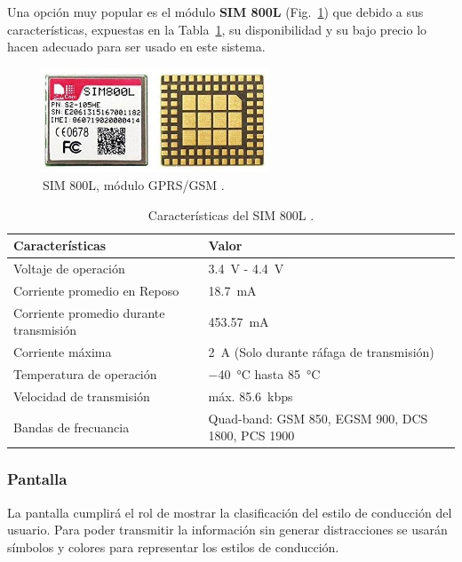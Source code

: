 Una opción muy popular es el módulo \textbf{SIM 800L} (Fig.~\ref{fig:SIM}) que debido a sus características, expuestas en la Tabla~\ref{diag:SIM}, su disponibilidad y su bajo precio lo hacen adecuado para ser usado en este sistema.

\begin{figure}[hbtp!]
\centering
\includegraphics[width=0.6\textwidth]{SIM800L.jpg}
\caption[SIM 800L, módulo GPRS/GSM]{SIM 800L, módulo GPRS/GSM \cite{SIM800L}.}
\label{fig:SIM}
\end{figure}

\bgroup
\def\arraystretch{1.5}%
\begin{table}[htbp!]
\centering
\caption[Características del SIM 800L]{Características del SIM 800L \cite{SIM800L}.}
\begin{tabular}{@{}p{5.4cm}p{8cm}@{}}
\toprule
Características & Valor \\ \midrule
Voltaje de operación & \SI{3.4}{V} -  \SI{4.4}{V} \\
Corriente promedio en Reposo & \SI{18.7}{mA} \\
Corriente promedio durante \mbox{transmisión} & \SI{453.57}{mA} \\
Corriente máxima & \SI{2}{A} (Solo durante ráfaga de transmisión) \\
Temperatura de operación & \SI{-40}{\celsius} hasta \SI{85}{\celsius} \\
Velocidad de transmisión & máx. \SI{85.6}{kbps} \\
Bandas de frecuancia & Quad-band: GSM 850, EGSM 900, DCS 1800, PCS 1900 \\ \bottomrule
\end{tabular}
\label{diag:SIM}
\end{table}
\egroup






\subsubsection{Pantalla}
La pantalla cumplirá el rol de mostrar la clasificación del estilo de conducción del usuario. Para poder transmitir la información sin generar distracciones se usarán símbolos y colores para representar los estilos de conducción.


